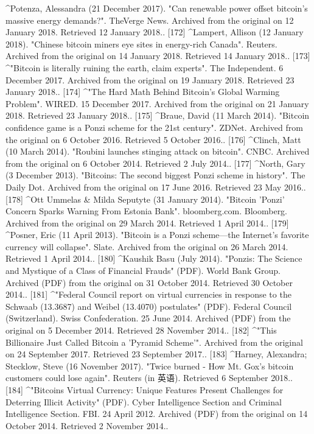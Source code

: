 ^Potenza, Alessandra (21 December 2017). "Can renewable power offset bitcoin's massive energy demands?". TheVerge News. Archived from the original on 12 January 2018. Retrieved 12 January 2018..
[172]
^Lampert, Allison (12 January 2018). "Chinese bitcoin miners eye sites in energy-rich Canada". Reuters. Archived from the original on 14 January 2018. Retrieved 14 January 2018..
[173]
^"Bitcoin is literally ruining the earth, claim experts". The Independent. 6 December 2017. Archived from the original on 19 January 2018. Retrieved 23 January 2018..
[174]
^"The Hard Math Behind Bitcoin's Global Warming Problem". WIRED. 15 December 2017. Archived from the original on 21 January 2018. Retrieved 23 January 2018..
[175]
^Braue, David (11 March 2014). "Bitcoin confidence game is a Ponzi scheme for the 21st century". ZDNet. Archived from the original on 6 October 2016. Retrieved 5 October 2016..
[176]
^Clinch, Matt (10 March 2014). "Roubini launches stinging attack on bitcoin". CNBC. Archived from the original on 6 October 2014. Retrieved 2 July 2014..
[177]
^North, Gary (3 December 2013). "Bitcoins: The second biggest Ponzi scheme in history". The Daily Dot. Archived from the original on 17 June 2016. Retrieved 23 May 2016..
[178]
^Ott Ummelas & Milda Seputyte (31 January 2014). "Bitcoin 'Ponzi' Concern Sparks Warning From Estonia Bank". bloomberg.com. Bloomberg. Archived from the original on 29 March 2014. Retrieved 1 April 2014..
[179]
^Posner, Eric (11 April 2013). "Bitcoin is a Ponzi scheme—the Internet's favorite currency will collapse". Slate. Archived from the original on 26 March 2014. Retrieved 1 April 2014..
[180]
^Kaushik Basu (July 2014). "Ponzis: The Science and Mystique of a Class of Financial Frauds" (PDF). World Bank Group. Archived (PDF) from the original on 31 October 2014. Retrieved 30 October 2014..
[181]
^"Federal Council report on virtual currencies in response to the Schwaab (13.3687) and Weibel (13.4070) postulates" (PDF). Federal Council (Switzerland). Swiss Confederation. 25 June 2014. Archived (PDF) from the original on 5 December 2014. Retrieved 28 November 2014..
[182]
^"This Billionaire Just Called Bitcoin a 'Pyramid Scheme'". Archived from the original on 24 September 2017. Retrieved 23 September 2017..
[183]
^Harney, Alexandra; Stecklow, Steve (16 November 2017). "Twice burned - How Mt. Gox's bitcoin customers could lose again". Reuters (in 英语). Retrieved 6 September 2018..
[184]
^"Bitcoins Virtual Currency: Unique Features Present Challenges for Deterring Illicit Activity" (PDF). Cyber Intelligence Section and Criminal Intelligence Section. FBI. 24 April 2012. Archived (PDF) from the original on 14 October 2014. Retrieved 2 November 2014..
